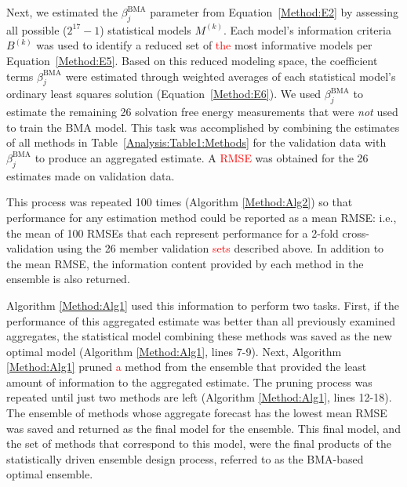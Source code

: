 \documentclass[journal=jpcbfk, manuscript=article]{achemso}
\newcommand{\+}[1]{\ensuremath{\mathbf{#1}}}
\newcommand{\rev}[1]{\textsf{\textcolor{red}{#1}}}
\begin{document}
Next, we estimated the $\beta_j^{\text{BMA}}$ parameter from Equation~\ref{Method:E2} by assessing all possible ($2^{17} -1$) statistical models $M^{(k)}$.
Each model's information criteria $B^{(k)}$ was used to identify a reduced set of \rev{the} most informative models per Equation~\ref{Method:E5}.
Based on this reduced modeling space, the coefficient terms $\beta_j^{\text{BMA}}$ were estimated through weighted averages of each statistical model's ordinary least squares solution (Equation~\ref{Method:E6}).
We used $\beta_j^{\text{BMA}}$ to estimate the remaining 26 solvation free energy measurements that were \emph{not} used to train the BMA model.
This task was accomplished by combining the estimates of all methods in Table~\ref{Analysis:Table1:Methods} for the validation data with $\beta_j^{\text{BMA}}$ to produce an aggregated estimate. 
A \rev{RMSE} was obtained for the 26 estimates made on validation data.

This process was repeated 100 times (Algorithm \ref{Method:Alg2}) so that performance for any estimation method could be reported as a mean RMSE: i.e., the mean of 100 RMSEs that each represent performance for a 2-fold cross-validation using the 26 member validation \rev{sets} described above.
In addition to the mean RMSE, the information content provided by each method in the ensemble is also returned. 

Algorithm \ref{Method:Alg1} used this information to perform two tasks.
First, if the performance of this aggregated estimate was better than all previously examined aggregates, the statistical model combining these methods was saved as the new optimal model (Algorithm \ref{Method:Alg1}, lines 7-9).
Next, Algorithm \ref{Method:Alg1} pruned \rev{a} method from the ensemble that provided the least amount of information to the aggregated estimate.
The pruning process was repeated until just two methods are left (Algorithm \ref{Method:Alg1}, lines 12-18).
The ensemble of methods whose aggregate forecast has the lowest mean RMSE was saved and returned as the final model for the ensemble.
This final model, and the set of methods that correspond to this model, were the final products of the statistically driven ensemble design process, referred to as the BMA-based optimal ensemble.
\end{document}
